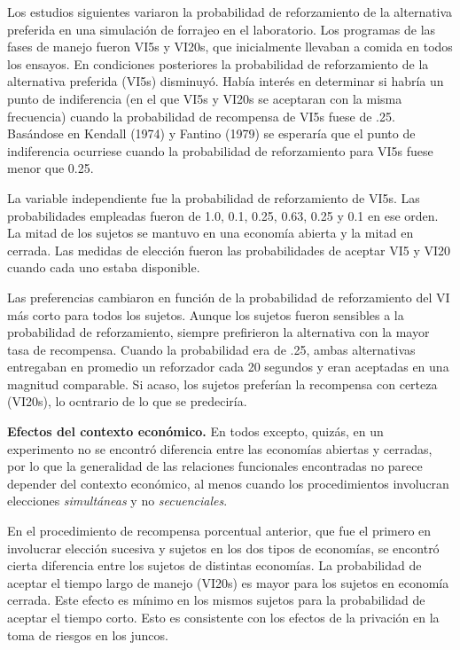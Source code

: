 \documentclass[a4paper,12pt]{article}
\begin{document}
Los estudios siguientes variaron la probabilidad de reforzamiento de la alternativa preferida en una simulación de forrajeo en el laboratorio. Los programas de las fases de manejo fueron VI5s y VI20s, que inicialmente llevaban a comida en todos los ensayos. En condiciones posteriores la probabilidad de reforzamiento de la alternativa preferida (VI5s) disminuyó. Había interés en determinar si habría un punto de indiferencia (en el que VI5s y VI20s se aceptaran con la misma frecuencia) cuando la probabilidad de recompensa de VI5s fuese de .25. Basándose en Kendall (1974) y Fantino (1979) se esperaría que el punto de indiferencia ocurriese cuando la probabilidad de reforzamiento para VI5s fuese menor que 0.25. 

La variable independiente fue la probabilidad de reforzamiento de VI5s. Las probabilidades empleadas fueron de 1.0, 0.1, 0.25, 0.63, 0.25 y 0.1 en ese orden. La mitad de los sujetos se mantuvo en una economía abierta y la mitad en cerrada. Las medidas de elección fueron las probabilidades de aceptar VI5 y VI20 cuando cada uno estaba disponible.

Las preferencias cambiaron en función de la probabilidad de reforzamiento del VI más corto para todos los sujetos. Aunque los sujetos fueron sensibles a la probabilidad de reforzamiento, siempre prefirieron la alternativa con la mayor tasa de recompensa. Cuando la probabilidad era de .25, ambas alternativas entregaban en promedio un reforzador cada 20 segundos y eran aceptadas en una magnitud comparable. Si acaso, los sujetos preferían la recompensa con certeza (VI20s), lo ocntrario de lo que se predeciría.

{\bfseries Efectos del contexto económico.} En todos excepto, quizás, en un experimento no se encontró diferencia entre las economías abiertas y cerradas, por lo que la generalidad de las relaciones funcionales encontradas no parece depender del contexto económico, al menos cuando los procedimientos involucran elecciones {\itshape simultáneas} y no {\itshape secuenciales}. 

En el procedimiento de recompensa porcentual anterior, que fue el primero en involucrar elección sucesiva y sujetos en los dos tipos de economías, se encontró cierta diferencia entre los sujetos de distintas economías. La probabilidad de aceptar el tiempo largo de manejo (VI20s) es mayor para los sujetos en economía cerrada. Este efecto es mínimo en los mismos sujetos para la probabilidad de aceptar el tiempo corto. Esto es consistente con los efectos de la privación en la toma de riesgos en los juncos.
\end{document}

